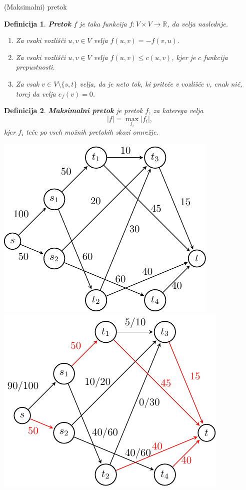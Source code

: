 \documentclass{beamer}
\newtheorem{definicija}{Definicija}
\begin{document}
\begin{frame}{(Maksimalni) pretok}
    \begin{definicija}
    \textbf{Pretok} $f$ je taka funkcija $f\colon V \times V \rightarrow \mathbb{R}$, da velja naslednje.
    \begin{enumerate}
        \item Za vsaki vozlišči $u,v \in V$ velja $f(u,v) = - f(v,u)$.
        \item Za vsaki vozlišči $u,v \in V$ velja $f(u,v) \leq c(u,v)$, kjer je $c$ funkcija prepustnosti.
        \item Za vsak $v \in V \setminus\{s,t\}$ velja, da je neto tok, ki priteče v vozlišče $v$, enak nič, torej da velja $e_f(v) = 0$.
    \end{enumerate}
    \end{definicija}

    \begin{definicija}
    \textbf{Maksimalni pretok} je pretok $f$, za katerega velja \[|f| = \max_{f_i} |f_i|,\] kjer $f_i$ teče po vseh možnih pretokih skozi omrežje.
    \end{definicija}
\end{frame}

\begin{frame}
    \centering
    \includegraphics[scale=0.7]{../writing/images/primer1-1.pdf}~~~
    \includegraphics[scale=0.7]{../writing/images/primer1-3.pdf}
\end{frame}
\end{document}
